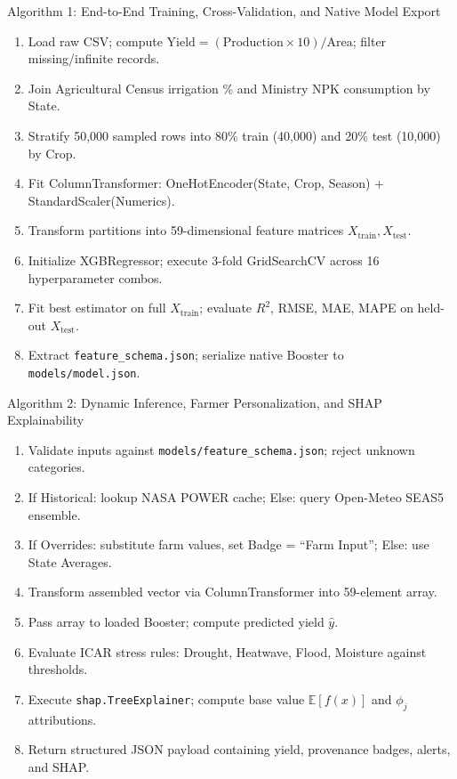 \documentclass[11pt,a4paper]{report}
\begin{document}
\begin{algorithmbox}{Algorithm 1: End-to-End Training, Cross-Validation, and Native Model Export}
\small
\begin{enumerate}
  \item Load raw CSV; compute $\text{Yield} = (\text{Production} \times 10) / \text{Area}$; filter missing/infinite records.
  \item Join Agricultural Census irrigation \% and Ministry NPK consumption by State.
  \item Stratify 50,000 sampled rows into 80\% train (40,000) and 20\% test (10,000) by Crop.
  \item Fit ColumnTransformer: OneHotEncoder(State, Crop, Season) + StandardScaler(Numerics).
  \item Transform partitions into 59-dimensional feature matrices $X_{\text{train}}, X_{\text{test}}$.
  \item Initialize XGBRegressor; execute 3-fold GridSearchCV across 16 hyperparameter combos.
  \item Fit best estimator on full $X_{\text{train}}$; evaluate $R^2$, RMSE, MAE, MAPE on held-out $X_{\text{test}}$.
  \item Extract \texttt{feature\_schema.json}; serialize native Booster to \texttt{models/model.json}.
\end{enumerate}
\end{algorithmbox}

\begin{algorithmbox}{Algorithm 2: Dynamic Inference, Farmer Personalization, and SHAP Explainability}
\small
\begin{enumerate}
  \item Validate inputs against \texttt{models/feature\_schema.json}; reject unknown categories.
  \item If Historical: lookup NASA POWER cache; Else: query Open-Meteo SEAS5 ensemble.
  \item If Overrides: substitute farm values, set Badge = ``Farm Input''; Else: use State Averages.
  \item Transform assembled vector via ColumnTransformer into 59-element array.
  \item Pass array to loaded Booster; compute predicted yield $\hat{y}$.
  \item Evaluate ICAR stress rules: Drought, Heatwave, Flood, Moisture against thresholds.
  \item Execute \texttt{shap.TreeExplainer}; compute base value $\mathbb{E}[f(x)]$ and $\phi_j$ attributions.
  \item Return structured JSON payload containing yield, provenance badges, alerts, and SHAP.
\end{enumerate}
\end{algorithmbox}
\end{document}
